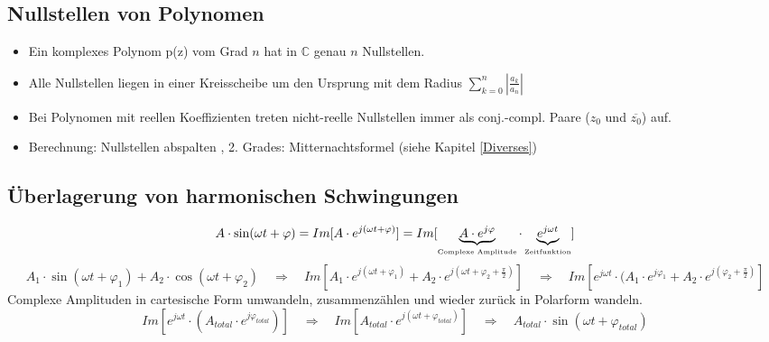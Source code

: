\subsection{Nullstellen von Polynomen}
\begin{itemize}
  \item Ein komplexes Polynom p(z) vom Grad $n$ hat in $ \mathbb{C}$ genau $n$
  Nullstellen.
  \item Alle Nullstellen liegen in einer Kreisscheibe um den Ursprung mit dem
  Radius $ \sum\limits_{k=0}^{n} \left| \frac{a_k}{a_n} \right|$
  \item Bei Polynomen mit reellen Koeffizienten treten nicht-reelle Nullstellen
  immer als conj.-compl. Paare ($z_0$ und $\overline{z_0}$) auf.
  \item Berechnung: Nullstellen abspalten , 2. Grades: Mitternachtsformel (siehe
  Kapitel \ref{Diverses}) 
\end{itemize}

\subsection{Überlagerung von harmonischen Schwingungen}
$$A \cdot \sin(\omega t + \varphi) = Im[A \cdot e^{j(\omega t + \varphi)}] =
Im[\underbrace{A \cdot e^{j\varphi}}_{\text{\tiny{Complexe Amplitude}}}
\cdot \underbrace{e^{j\omega t}}_{\text{\tiny{Zeitfunktion}}}]$$
%
%
$$ A_1 \cdot \sin(\omega t + \varphi_1) + A_2 \cdot \cos(\omega t + \varphi_2) 
 \quad \Rightarrow \quad 
 Im[A_1 \cdot e^{j(\omega t + \varphi_1)} + A_2 \cdot e^{j (\omega t + \varphi_2
 + \frac{\pi}{2})}] \quad \Rightarrow \quad 
 Im[e^{j \omega t} \cdot  (A_1 \cdot e^{j \varphi_1} + A_2 \cdot e^{j (\varphi_2
 + \frac{\pi}{2})}]$$ 
Complexe Amplituden in cartesische Form umwandeln, zusammenzählen und wieder
zurück in Polarform wandeln.
$$ Im[e^{j \omega t} \cdot  (A_{total} \cdot e^{j \varphi_{total}})] 
 \quad \Rightarrow \quad 
 Im[A_{total} \cdot e^{j (\omega t + \varphi_{total})}] 
 \quad \Rightarrow \quad 
 A_{total} \cdot \sin(\omega t + \varphi_{total})$$

